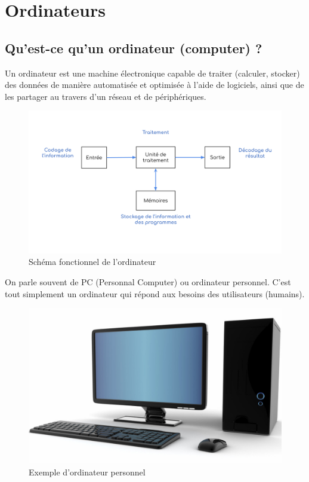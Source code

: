 \documentclass[11pt, a4paper]{book}
\begin{document}
\setcounter{chapter}{2}

\chapter{Ordinateurs}

\section{Qu’est-ce qu’un ordinateur (computer) ?}

\begin{defi}
	Un ordinateur est une machine électronique capable de traiter (calculer, stocker) des données de manière automatisée et optimisée à l'aide de logiciels, ainsi que de les partager au travers d'un réseau et de périphériques. 
\end{defi}

\begin{center}
\begin{figure}[ht!]
	\includegraphics[scale=.4]{images/shema_ordinateur.png}
	\caption{Schéma fonctionnel de l'ordinateur}
\end{figure}
\end{center}
	
	On parle souvent de PC (Personnal Computer) ou ordinateur personnel. C'est tout simplement un ordinateur qui répond aux besoins des utilisateurs (humains).

\begin{center}
\begin{figure}[h]
	\includegraphics[scale=.3]{images/ordinateur}
	\caption{Exemple d'ordinateur personnel}
\end{figure}
\end{center}
	
\end{document}
